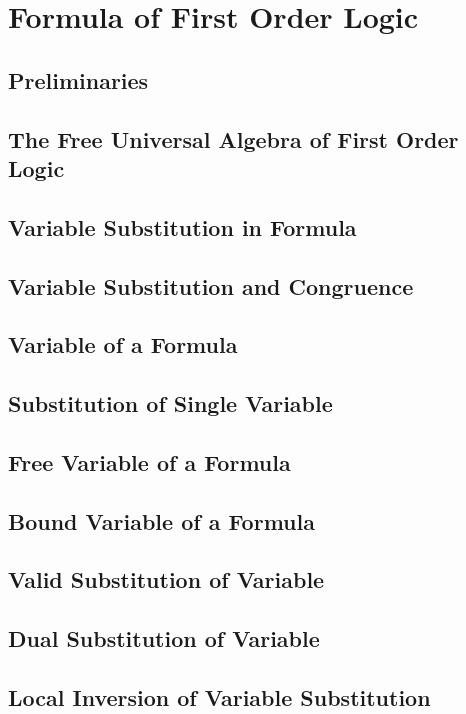 \section{Formula of First Order Logic}
    \subsection{Preliminaries}
      
    \subsection{The Free Universal Algebra of First Order Logic}
      
    \subsection{Variable Substitution in Formula}
      
    \subsection{Variable Substitution and Congruence}
      
    \subsection{Variable of a Formula}
      
    \subsection{Substitution of Single Variable}
      
    \subsection{Free Variable of a Formula}
      
    \subsection{Bound Variable of a Formula}
      
    \subsection{Valid Substitution of Variable}
      
    \subsection{Dual Substitution of Variable}
      
    \subsection{Local Inversion of Variable Substitution}
      
